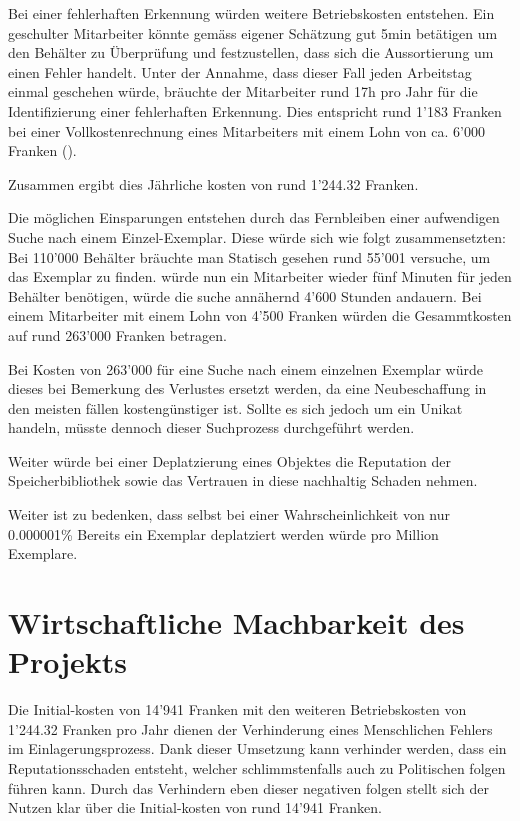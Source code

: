 Bei einer fehlerhaften Erkennung würden weitere Betriebskosten entstehen. Ein geschulter Mitarbeiter könnte gemäss eigener Schätzung gut 5min betätigen um den Behälter zu Überprüfung und festzustellen, dass sich die Aussortierung um einen Fehler handelt.
Unter der Annahme, dass dieser Fall jeden Arbeitstag einmal geschehen würde, bräuchte der Mitarbeiter rund 17h pro Jahr für die Identifizierung einer fehlerhaften Erkennung. Dies entspricht rund 1'183 Franken bei einer Vollkostenrechnung eines Mitarbeiters mit einem Lohn von ca. 6'000 Franken (\cite{KostenProMitarbeiter2013}).

Zusammen ergibt dies Jährliche kosten von rund 1'244.32 Franken.

Die möglichen Einsparungen entstehen durch das Fernbleiben einer aufwendigen Suche nach einem Einzel-Exemplar. Diese würde sich wie folgt zusammensetzten:
Bei 110'000 Behälter bräuchte man Statisch gesehen rund 55'001 versuche, um das Exemplar zu finden. würde nun ein Mitarbeiter wieder fünf Minuten für jeden Behälter benötigen, würde die suche annähernd 4'600 Stunden andauern. Bei einem Mitarbeiter mit einem Lohn von 4'500 Franken würden die Gesammtkosten auf rund 263'000 Franken betragen.

Bei Kosten von 263'000 für eine Suche nach einem einzelnen Exemplar würde dieses bei Bemerkung des Verlustes ersetzt werden, da eine Neubeschaffung in den meisten fällen kostengünstiger ist. Sollte es sich jedoch um ein Unikat handeln, müsste dennoch dieser Suchprozess durchgeführt werden.

Weiter würde bei einer Deplatzierung eines Objektes die Reputation der Speicherbibliothek sowie das Vertrauen in diese nachhaltig Schaden nehmen.

Weiter ist zu bedenken, dass selbst bei einer Wahrscheinlichkeit von nur 0.000001\% Bereits ein Exemplar deplatziert werden würde pro Million Exemplare.

\chapter{Wirtschaftliche Machbarkeit des Projekts}
Die Initial-kosten von 14'941 Franken mit den weiteren Betriebskosten von 1'244.32 Franken pro Jahr dienen der Verhinderung eines Menschlichen Fehlers im Einlagerungsprozess. Dank dieser Umsetzung kann verhinder werden, dass ein Reputationsschaden entsteht, welcher schlimmstenfalls auch zu Politischen folgen führen kann.
Durch das Verhindern eben dieser negativen folgen stellt sich der Nutzen klar über die Initial-kosten von rund 14'941 Franken.

